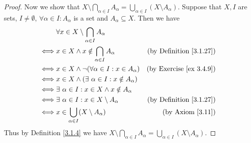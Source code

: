 \begin{proof}
    Now we show that \(X \setminus \bigcap_{\alpha \in I} A_{\alpha} = \bigcup_{\alpha \in I} (X \setminus A_{\alpha})\).
    Suppose that \(X, I\) are sets, \(I \neq \emptyset\), \(\forall \alpha \in I : A_{\alpha}\) is a set and \(A_{\alpha} \subseteq X\).
    Then we have
    \begin{align*}
             & \forall x \in X \setminus \bigcap_{\alpha \in I} A_{\alpha}                                        \\
        \iff & x \in X \land x \notin \bigcap_{\alpha \in I} A_{\alpha}     & \text{(by Definition \ref{3.1.27})} \\
        \iff & x \in X \land \lnot(\forall \alpha \in I : x \in A_{\alpha}) & \text{(by Exercise \ref{ex 3.4.9})} \\
        \iff & x \in X \land (\exists\ \alpha \in I : x \notin A_{\alpha})                                        \\
        \iff & \exists\ \alpha \in I : x \in X \land x \notin A_{\alpha}                                          \\
        \iff & \exists\ \alpha \in I : x \in X \setminus A_{\alpha}         & \text{(by Definition \ref{3.1.27})} \\
        \iff & x \in \bigcup_{\alpha \in I} (X \setminus A_{\alpha})        & \text{(by Axiom \ref{3.11})}        \\
    \end{align*}
    Thus by Definition \ref{3.1.4} we have \(X \setminus \bigcap_{\alpha \in I} A_{\alpha} = \bigcup_{\alpha \in I} (X \setminus A_{\alpha})\).
\end{proof}